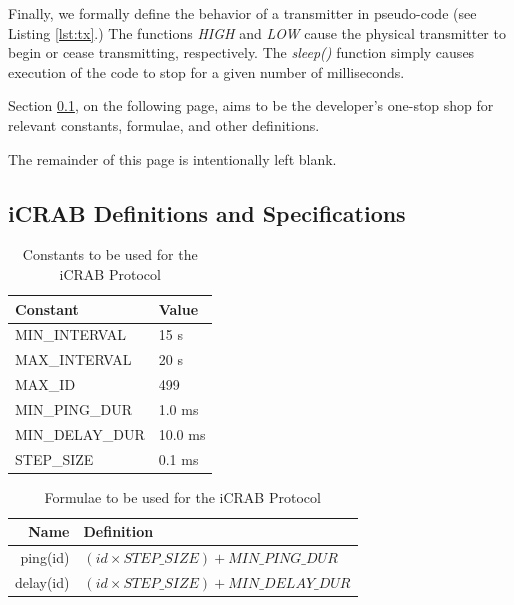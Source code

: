 \documentclass[12pt]{article}
\begin{document}
Finally, we formally define the behavior of a transmitter in pseudo-code
(see Listing \ref{lst:tx}.)
The functions {\em HIGH} and {\em LOW} cause the physical transmitter to begin
or cease transmitting, respectively.
The {\em sleep()} function simply causes execution of the code to stop for a
given number of milliseconds.

Section \ref{specs}, on the following page,
aims to be the developer's one-stop shop for relevant constants,
formulae, and other definitions.

\vfill

\begin{center}
The remainder of this page is intentionally left blank.
\end{center}

\vfill

\newpage
\subsection{iCRAB Definitions and Specifications} \label{specs}

\begin{table}[ht]
\centering
\begin{tabular}{|l|l|}
\hline
Constant & Value \\
\hline
MIN\_INTERVAL	&	15 s		\\
MAX\_INTERVAL	&	20 s		\\
MAX\_ID			&	499		\\
MIN\_PING\_DUR	&	1.0 ms	\\
MIN\_DELAY\_DUR	&	10.0 ms	\\
STEP\_SIZE		&	0.1	ms	\\
\hline
\end{tabular}
\caption{Constants to be used for the iCRAB Protocol}\label{table:constants}
\end{table}

\begin{table}[ht]
\centering
\begin{tabular}{|r|l|}
\hline
Name & Definition \\
\hline
ping(id)		&	$(id \times STEP\_SIZE)+MIN\_PING\_DUR$	\\
delay(id)	&	$(id \times STEP\_SIZE)+MIN\_DELAY\_DUR$	\\
\hline
\end{tabular}
\caption{Formulae to be used for the iCRAB Protocol}\label{table:formulae}
\end{table}
\end{document}
